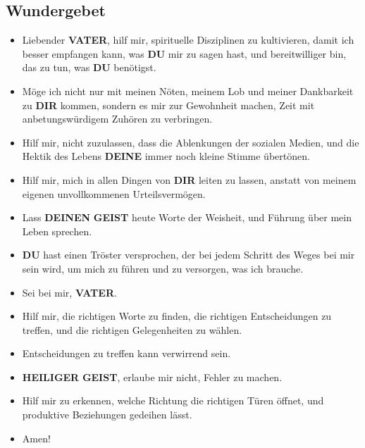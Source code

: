 \documentclass[12pt,a5paper]{article}
\newcommand{\Deinen}[0]{\textbf{DEINEN}}
\newcommand{\Deine}[0]{\textbf{DEINE}}
\newcommand{\Dir}[0]{\textbf{DIR}}
\newcommand{\Du}[0]{\textbf{DU}}
\newcommand{\Geist}[0]{\textbf{GEIST}}
\newcommand{\Heiliger}[0]{\textbf{HEILIGER}}
\newcommand{\Vater}[0]{\textbf{VATER}}
\begin{document}
	\subsection{Wundergebet}
		\begin{itemize}[nosep]
			\item	Liebender {\Vater},
					hilf mir,
					spirituelle Disziplinen zu kultivieren,
					damit ich besser empfangen kann,
					was {\Du} mir zu sagen hast,
					und bereitwilliger bin,
					das zu tun,
					was {\Du} ben\"otigst.
			\item	M\"oge ich nicht nur mit meinen N\"oten,
					meinem Lob und meiner Dankbarkeit zu {\Dir} kommen,
					sondern es mir zur Gewohnheit machen,
					Zeit mit anbetungsw\"urdigem Zuh\"oren zu verbringen.
			\item	Hilf mir,
					nicht zuzulassen,
					dass die Ablenkungen der sozialen Medien,
					und die Hektik des Lebens {\Deine} immer noch kleine Stimme \"ubert\"onen.
			\item	Hilf mir,
					mich in allen Dingen von {\Dir} leiten zu lassen,
					anstatt von meinem eigenen unvollkommenen Urteilsverm\"ogen.
			\item	Lass {\Deinen} {\Geist} heute Worte der Weisheit,
					und F\"uhrung \"uber mein Leben sprechen.
			\item	{\Du} hast einen Tr\"oster versprochen,
					der bei jedem Schritt des Weges bei mir sein wird,
					um mich zu f\"uhren und zu versorgen,
					was ich brauche.
			\item	Sei bei mir,
					{\Vater}.
			\item	Hilf mir,
					die richtigen Worte zu finden,
					die richtigen Entscheidungen zu treffen,
					und die richtigen Gelegenheiten zu w\"ahlen.
			\item	Entscheidungen zu treffen kann verwirrend sein.
			\item	{\Heiliger} {\Geist},
					erlaube mir nicht,
					Fehler zu machen.
			\item	Hilf mir zu erkennen,
					welche Richtung die richtigen T\"uren \"offnet,
					und produktive Beziehungen gedeihen l\"asst.
			\item	Amen!
		\end{itemize}
\end{document}
